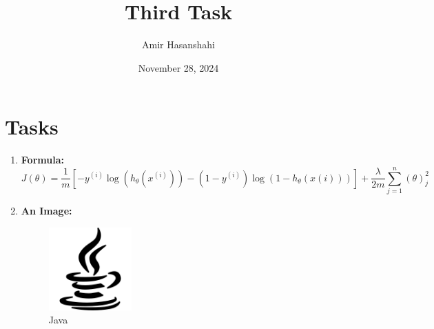 \documentclass{article}
\title{Third Task}
\author{Amir Hasanshahi}
\date{November 28, 2024}
\begin{document}
	\maketitle
    \tableofcontents

    \newpage
    \section{Tasks}
	\begin{enumerate}
		\item \textbf{Formula:}
			\begin{equation*}
				J(\theta) = \frac{1}{m}\left[-y^{(i)}\log(h_{\theta}(x^{(i)})) -(1 - y^{(i)}
				) \log(1-h_{\theta}(x(i)))\right] + \frac{\lambda}{2m}\sum_{j = 1}^{n}(\theta
				)_{j}^{2}
			\end{equation*}

		\item \textbf{An Image:}
			\begin{figure}[h]
				\centering
				\includegraphics[width=0.3\textwidth]{java.png}
				\caption{Java}
				\label{java}
			\end{figure}


\end{enumerate}
\end{document}

